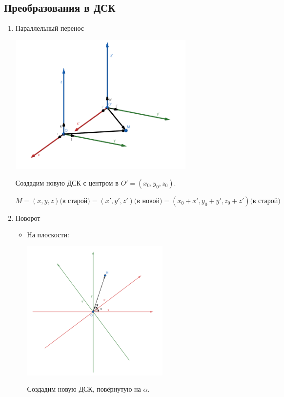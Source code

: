 \documentclass[twoside]{book}
\begin{document}
\subsection{Преобразования в ДСК}
\begin{enumerate}[label=\alph*)]
    \item Параллельный перенос
          \begin{center}
              \includegraphics[height=7cm]{Images/Chapter_1/1-3-1.png}
          \end{center}
          Создадим новую ДСК с центром в \(O' = (x_0, y_0, z_0)\).

          \(M = (x, y, z) \text{(в старой)} = (x', y', z') \text{(в новой)} = (x_0 + x', y_0 + y', z_0 + z') \text{(в старой)}\)
    \item Поворот
          \begin{itemize}
              \item На плоскости:
                    \begin{center}
                        \includegraphics[height=7cm]{Images/Chapter_1/1-3-2.png}
                    \end{center}
                    Создадим новую ДСК, повёрнутую на \(\alpha\).


\end{itemize}
\end{enumerate}
\end{document}
